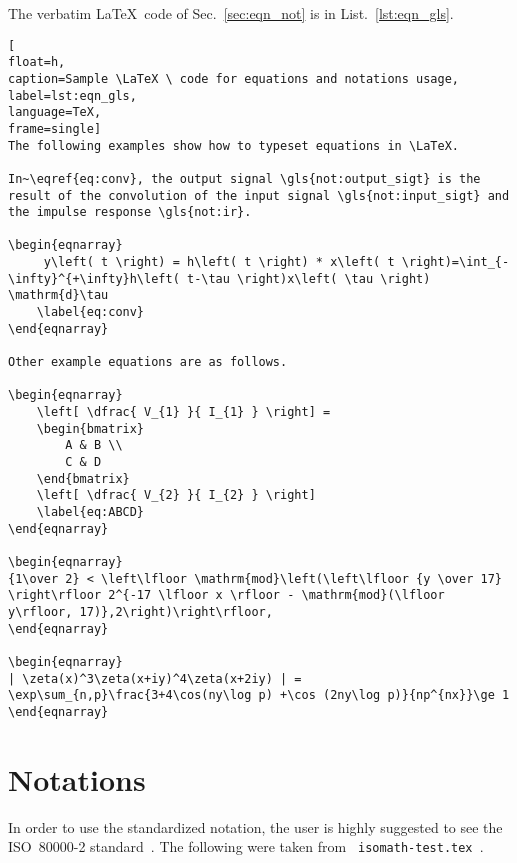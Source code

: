 \newpage
The verbatim \LaTeX \ code of Sec.~\ref{sec:eqn_not} is in List.~\ref{lst:eqn_gls}.

\begin{lstlisting}[
float=h,
caption=Sample \LaTeX \ code for equations and notations usage, 
label=lst:eqn_gls,
language=TeX,
frame=single]
The following examples show how to typeset equations in \LaTeX. 

In~\eqref{eq:conv}, the output signal \gls{not:output_sigt} is the result of the convolution of the input signal \gls{not:input_sigt} and the impulse response \gls{not:ir}.

\begin{eqnarray}   
     y\left( t \right) = h\left( t \right) * x\left( t \right)=\int_{-\infty}^{+\infty}h\left( t-\tau \right)x\left( \tau \right) \mathrm{d}\tau
	\label{eq:conv}
\end{eqnarray}

Other example equations are as follows.

\begin{eqnarray}
	\left[ \dfrac{ V_{1} }{ I_{1} } \right] = 
	\begin{bmatrix}
		A & B \\ 
		C & D 
	\end{bmatrix} 
	\left[ \dfrac{ V_{2} }{ I_{2} } \right]
	\label{eq:ABCD}
\end{eqnarray}

\begin{eqnarray}
{1\over 2} < \left\lfloor \mathrm{mod}\left(\left\lfloor {y \over 17} \right\rfloor 2^{-17 \lfloor x \rfloor - \mathrm{mod}(\lfloor y\rfloor, 17)},2\right)\right\rfloor,
\end{eqnarray}

\begin{eqnarray}
| \zeta(x)^3\zeta(x+iy)^4\zeta(x+2iy) | = 
\exp\sum_{n,p}\frac{3+4\cos(ny\log p) +\cos (2ny\log p)}{np^{nx}}\ge 1
\end{eqnarray}
\end{lstlisting}
\cleardoublepage







\newpage
\section{Notations}
\label{sec:not}
In order to use the standardized notation, the user is highly suggested to see the ISO~80000-2 standard~\cite{ISO800002}. The following were taken from \verb| isomath-test.tex |.

